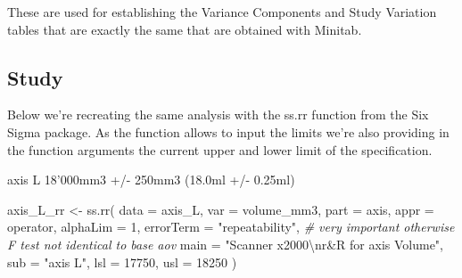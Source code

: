\documentclass[
]{book}
\newenvironment{Shaded}{\begin{snugshade}}{\end{snugshade}}
\newcommand{\AttributeTok}[1]{\textcolor[rgb]{0.77,0.63,0.00}{#1}}
\newcommand{\CommentTok}[1]{\textcolor[rgb]{0.56,0.35,0.01}{\textit{#1}}}
\newcommand{\DecValTok}[1]{\textcolor[rgb]{0.00,0.00,0.81}{#1}}
\newcommand{\FunctionTok}[1]{\textcolor[rgb]{0.00,0.00,0.00}{#1}}
\newcommand{\NormalTok}[1]{#1}
\newcommand{\OtherTok}[1]{\textcolor[rgb]{0.56,0.35,0.01}{#1}}
\newcommand{\SpecialCharTok}[1]{\textcolor[rgb]{0.00,0.00,0.00}{#1}}
\newcommand{\StringTok}[1]{\textcolor[rgb]{0.31,0.60,0.02}{#1}}
\begin{document}
These are used for establishing the Variance Components and Study Variation tables that are exactly the same that are obtained with Minitab.

\hypertarget{study}{%
\subsection{Study}\label{study}}

Below we're recreating the same analysis with the ss.rr function from the Six Sigma package. As the function allows to input the limits we're also providing in the function arguments the current upper and lower limit of the specification.

axis L 18'000mm3 +/- 250mm3 (18.0ml +/- 0.25ml)

\begin{Shaded}
\begin{Highlighting}[]
\NormalTok{axis\_L\_rr }\OtherTok{\textless{}{-}} \FunctionTok{ss.rr}\NormalTok{(}
  \AttributeTok{data =}\NormalTok{ axis\_L, }
  \AttributeTok{var =}\NormalTok{ volume\_mm3, }
  \AttributeTok{part =}\NormalTok{ axis, }
  \AttributeTok{appr =}\NormalTok{ operator, }
  \AttributeTok{alphaLim =} \DecValTok{1}\NormalTok{,}
  \AttributeTok{errorTerm =} \StringTok{"repeatability"}\NormalTok{, }\CommentTok{\# very important otherwise F test not identical to base aov}
  \AttributeTok{main =} \StringTok{"Scanner x2000}\SpecialCharTok{\textbackslash{}n}\StringTok{r\&R for axis Volume"}\NormalTok{,}
  \AttributeTok{sub =} \StringTok{"axis L"}\NormalTok{,}
  \AttributeTok{lsl =} \DecValTok{17750}\NormalTok{,}
  \AttributeTok{usl =} \DecValTok{18250}
\NormalTok{)}
\end{Highlighting}
\end{Shaded}
\end{document}
